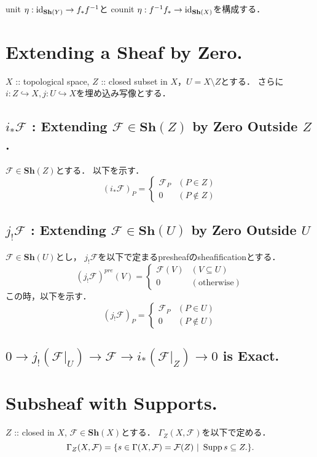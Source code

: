 \documentclass[a4paper]{jsarticle}
\newcommand{\shF}{\mathcal{F}}
\newcommand{\Sh}{\mathbf{Sh}}
\begin{document}
    unit $\eta: \id{\Sh(Y)} \to f_* f^{-1}$と
    counit $\eta: f^{-1} f_* \to \id{\Sh(X)}$を構成する．

\section{Extending a Sheaf by Zero.} %
    $X$ :: topological space, $Z$ :: closed subset in $X$，$U=X \setminus Z$とする．
    さらに$i: Z \hookrightarrow X, j: U \hookrightarrow X$を埋め込み写像とする．

    \subsection{$i_* \shF$ : Extending $\shF \in \Sh(Z)$ by Zero Outside $Z$.}
    $\shF \in \Sh(Z)$とする．
    以下を示す．
    \[
        (i_* \shF)_P=
        \begin{cases}{}
            \shF_P & (P \in Z) \\
            0 & (P \not \in Z)
        \end{cases}
    \]

    \subsection{$j_! \shF$ : Extending $\shF \in \Sh(U)$ by Zero Outside $U$}
    $\shF \in \Sh(U)$とし，
    $j_! \shF$を以下で定まるpresheafのsheafificationとする．
    \[
        (j_! \shF)^{pre}(V)=
        \begin{cases}{}
            \shF(V) & (V \subseteq U) \\
            0 & (\text{otherwise})
        \end{cases}
    \]
    この時，以下を示す．
    \[
        (j_! \shF)_P=
        \begin{cases}{}
            \shF_P & (P \in U) \\
            0 & (P \not \in U)
        \end{cases}
    \]

    \subsection{$0 \to j_!(\shF|_U) \to \shF \to i_*(\shF|_Z) \to 0$ is Exact.}

\section{Subsheaf with Supports.} %
    $Z$ :: closed in $X$, $\shF \in \Sh(X)$とする．
    $\Gamma_Z(X, \shF)$を以下で定める．
    \[ \Gamma_Z(X, \shF)=\{ s \in \Gamma(X, \shF)=\shF(Z) ~|~ \Supp s \subseteq Z. \}. \]
\end{document}

